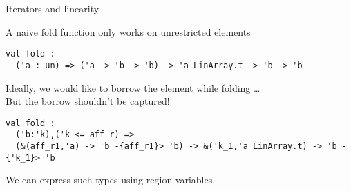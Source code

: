 \documentclass[xcolor=svgnames,11pt]{beamer}
\begin{document}
\begin{frame}[fragile]{Iterators and linearity}

  A naive fold function only works on unrestricted elements
\begin{lstlisting}
val fold :
  ('a : un) => ('a -> 'b -> 'b) -> 'a LinArray.t -> 'b -> 'b
\end{lstlisting}\pause

Ideally, we would like to borrow the element while folding \dots\\
But the borrow shouldn't be captured!\pause

\begin{lstlisting}
val fold :
  ('b:'k),('k <= aff_r) =>
  (&(aff_r1,'a) -> 'b -{aff_r1}> 'b) -> &('k_1,'a LinArray.t) -> 'b -{'k_1}> 'b
\end{lstlisting}

We can express such types using region variables.

\end{frame}





\end{document}
